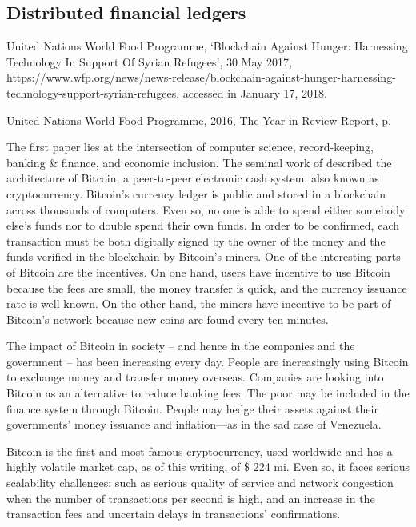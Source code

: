 \documentclass[12pt]{article}
\begin{document}
\subsection{Distributed financial ledgers}

United Nations World Food Programme, `Blockchain Against Hunger: Harnessing Technology In Support Of Syrian Refugees', 30 May 2017, https://www.wfp.org/news/news-release/blockchain-against-hunger-harnessing-technology-support-syrian-refugees, accessed in January 17, 2018.

United Nations World Food Programme, 2016, The Year in Review Report, p.

The first paper lies at the intersection of computer science, record-keeping, banking \& finance, and economic inclusion. The seminal work of \citet{nakamoto2008bitcoin} described the architecture of Bitcoin, a peer-to-peer electronic cash system, also known as cryptocurrency. Bitcoin's currency ledger is public and stored in a blockchain across thousands of computers. Even so, no one is able to spend either somebody else's funds nor to double spend their own funds. In order to be confirmed, each transaction must be both digitally signed by the owner of the money and the funds verified in the blockchain by Bitcoin's miners. One of the interesting parts of Bitcoin are the incentives. On one hand, users have incentive to use Bitcoin because the fees are small, the money transfer is quick, and the currency issuance rate is well known. On the other hand, the miners have incentive to be part of Bitcoin's network because new coins are found every ten minutes.

The impact of Bitcoin in society -- and hence in the companies and the government -- has been increasing every day. People are increasingly using Bitcoin to exchange money and transfer money overseas. Companies are looking into Bitcoin as an alternative to reduce banking fees. The poor may be included in the finance system through Bitcoin. People may hedge their assets against their governments' money issuance and inflation---as in the sad case of Venezuela.

Bitcoin is the first and most famous cryptocurrency, used worldwide and has a highly volatile market cap, as of this writing, of \$ 224 mi. Even so, it faces serious scalability challenges; such as serious quality of service and network congestion when the number of transactions per second is high, and an increase in the transaction fees and uncertain delays in transactions' confirmations.
\end{document}
